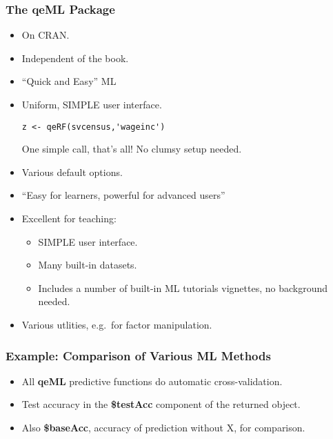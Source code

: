 \documentclass{beamer}
\begin{document}
\begin{frame}[fragile] 
\frametitle{The qeML Package}
\pause

\begin{itemize}

\item On CRAN.

\item Independent of the book. 

\item ``Quick and Easy'' ML

\item Uniform, {\Large SIMPLE} user interface.  

\begin{lstlisting}
z <- qeRF(svcensus,'wageinc')
\end{lstlisting} 

One simple call, that's all!  No clumsy setup needed.

\item Various default options.

\item ``Easy for learners, powerful for advanced users''

\item Excellent for teaching:

\begin{itemize}

\item {\Large SIMPLE} user interface.

\item Many built-in datasets.

\item Includes a number of built-in ML tutorials vignettes, no
background needed.

\end{itemize} 

\item Various utlities, e.g.\ for factor manipulation.

\end{itemize} 

\end{frame} 

\begin{frame} 
\frametitle{Example: Comparison of Various ML Methods}
\pause

\begin{itemize}

\item All \textbf{qeML} predictive functions do automatic cross-validation.

\item Test accuracy in the \textbf{\$testAcc} component of the returned object.

\item Also \textbf{\$baseAcc}, accuracy of prediction without X, for
comparison.

\end{itemize} 

\end{frame} 
\end{document}

